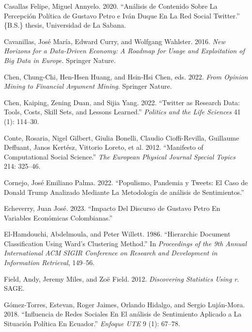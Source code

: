 \documentclass[
]{interact}
\newlength{\cslhangindent}
\newenvironment{CSLReferences}[2] %
 {\begin{list}{}{%
  \setlength{\itemindent}{0pt}
  \setlength{\leftmargin}{0pt}
  \setlength{\parsep}{0pt}
  \ifodd #1
   \setlength{\leftmargin}{\cslhangindent}
   \setlength{\itemindent}{-1\cslhangindent}
  \fi
  \setlength{\itemsep}{#2\baselineskip}}}
 {\end{list}}
\begin{document}
\begin{CSLReferences}{1}{0}
Casallas Felipe, Miguel Annyelo. 2020. {``An{á}lisis de Contenido Sobre
La Percepci{ó}n Pol{í}tica de Gustavo Petro e Iv{á}n Duque En La Red
Social Twitter.''} \{B.S.\} thesis, Universidad de La Sabana.

Cavanillas, José María, Edward Curry, and Wolfgang Wahlster. 2016.
\emph{New Horizons for a Data-Driven Economy: A Roadmap for Usage and
Exploitation of Big Data in Europe}. Springer Nature.

Chen, Chung-Chi, Hen-Hsen Huang, and Hsin-Hsi Chen, eds. 2022.
\emph{From Opinion Mining to Financial Argument Mining}. Springer
Nature.

Chen, Kaiping, Zening Duan, and Sijia Yang. 2022. {``Twitter as Research
Data: Tools, Costs, Skill Sets, and Lessons Learned.''} \emph{Politics
and the Life Sciences} 41 (1): 114--30.

Conte, Rosaria, Nigel Gilbert, Giulia Bonelli, Claudio Cioffi-Revilla,
Guillaume Deffuant, Janos Kertész, Vittorio Loreto, et al. 2012.
{``Manifesto of Computational Social Science.''} \emph{The European
Physical Journal Special Topics} 214: 325--46.

Cornejo, José Emiliano Palma. 2022. {``Populismo, Pandemia y Tweets: El
Caso de Donald Trump Analizado Mediante La Metodolog{í}a de an{á}lisis
de Sentimientos.''}

Echeverry, Juan José. 2023. {``Impacto Del Discurso de Gustavo Petro En
Variables Económicas Colombianas.''}

El-Hamdouchi, Abdelmoula, and Peter Willett. 1986. {``Hierarchic
Document Classification Using Ward's Clustering Method.''} In
\emph{Proceedings of the 9th Annual International ACM SIGIR Conference
on Research and Development in Information Retrieval}, 149--56.

Field, Andy, Jeremy Miles, and Zoë Field. 2012. \emph{Discovering
Statistics Using r}. SAGE.

Gómez-Torres, Estevan, Roger Jaimes, Orlando Hidalgo, and Sergio
Luján-Mora. 2018. {``Influencia de Redes Sociales En El an{á}lisis de
Sentimiento Aplicado a La Situaci{ó}n Pol{í}tica En Ecuador.''}
\emph{Enfoque UTE} 9 (1): 67--78.


\end{CSLReferences}
\end{document}
